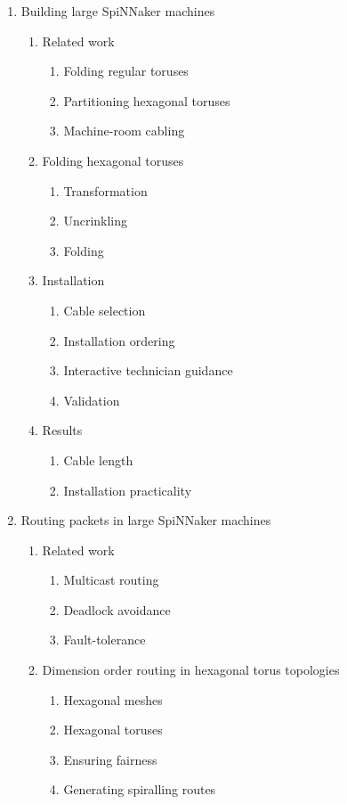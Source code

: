 \begin{enumerate}
	\item Building large SpiNNaker machines
	\begin{enumerate}
		\item Related work
		\begin{enumerate}
			\item Folding regular toruses
			\item Partitioning hexagonal toruses
			\item Machine-room cabling
		\end{enumerate}
		\item Folding hexagonal toruses
		\begin{enumerate}
			\item Transformation
			\item Uncrinkling
			\item Folding
		\end{enumerate}
		\item Installation
		\begin{enumerate}
			\item Cable selection
			\item Installation ordering
			\item Interactive technician guidance
			\item Validation
		\end{enumerate}
		\item Results
		\begin{enumerate}
			\item Cable length
			\item Installation practicality
		\end{enumerate}
	\end{enumerate}
	
	\item Routing packets in large SpiNNaker machines
	\begin{enumerate}
		\item Related work
		\begin{enumerate}
			\item Multicast routing
			\item Deadlock avoidance
			\item Fault-tolerance
		\end{enumerate}
		
		\item Dimension order routing in hexagonal torus topologies
		\begin{enumerate}
			\item Hexagonal meshes
			\item Hexagonal toruses
			\item Ensuring fairness
			\item Generating spiralling routes
		\end{enumerate}
		

\end{enumerate}
\end{enumerate}
